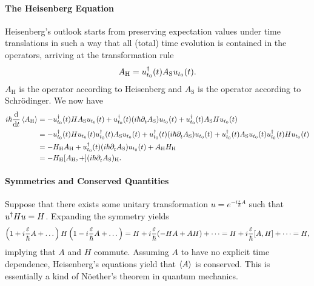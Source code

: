 \paragraph{The Heisenberg Equation}
Heisenberg's outlook starts from preserving expectation values under time translations in such a way that all (total) time evolution is contained in the operators, arriving at the transformation rule
\begin{align*}
	A_{\text{H}} = u_{t_{0}}^{\dagger}(t)A_{\text{S}}u_{t_{0}}(t).
\end{align*}
$A_{\text{H}}$ is the operator according to Heisenberg and $A_{\text{S}}$ is the operator according to Schrödinger. We now have
\begin{align*}
	i\hbar\dv{t}\expval{A_{\text{H}}} &= -\adj{u_{t_{0}}}(t)HA_{\text{S}}u_{t_{0}}(t) + \adj{u_{t_{0}}}(t)(i\hbar\del{t}{A_{\text{S}}})u_{t_{0}}(t) + \adj{u_{t_{0}}}(t)A_{\text{S}}Hu_{t_{0}}(t) \\
	                                  &= -\adj{u_{t_{0}}}(t)Hu_{t_{0}}(t)\adj{u_{t_{0}}}(t)A_{\text{S}}u_{t_{0}}(t) + \adj{u_{t_{0}}}(t)(i\hbar\del{t}{A_{\text{S}}})u_{t_{0}}(t) + \adj{u_{t_{0}}}(t)A_{\text{S}}u_{t_{0}}(t)\adj{u_{t_{0}}}(t)Hu_{t_{0}}(t) \\
	                                  &= -H_{\text{H}}A_{\text{H}} + \adj{u_{t_{0}}}(t)(i\hbar\del{t}{A_{\text{S}}})u_{t_{0}}(t) + A_{\text{H}}H_{\text{H}} \\
	                                  &= -{H_{\text{H}}}\comm{A_{\text{H}}} + (i\hbar\del{t}{A_{\text{S}}})_{\text{H}}.
\end{align*}

\paragraph{Symmetries and Conserved Quantities}
Suppose that there exists some unitary transformation $u = e^{-i\frac{\varepsilon}{\hbar}A}$ such that $u^{\dagger}Hu = H$. Expanding the symmetry yields
\begin{align*}
	\left(1 + i\frac{\varepsilon}{\hbar}A + \dots\right)H\left(1 - i\frac{\varepsilon}{\hbar}A + \dots\right) = H + i\frac{\varepsilon}{\hbar}(-HA + AH) + \dots = H + i\frac{\varepsilon}{\hbar}\comm{A}{H} + \dots = H,
\end{align*}
implying that $A$ and $H$ commute. Assuming $A$ to have no explicit time dependence, Heisenberg's equations yield that $\expval{A}$ is conserved. This is essentially a kind of Nöether's theorem in quantum mechanics.


